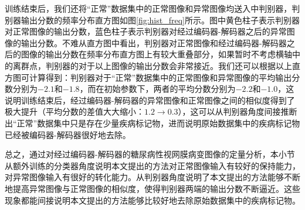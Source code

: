 训练结束后，我们还将“正常”数据集中的正常图像和异常图像均送入中判别器，判别器输出分数的频率分布直方图如图\ref{fig:hist_freq}所示。图中黄色柱子表示判别器对正常图像的输出分数，蓝色柱子表示判别器对经过编码器-解码器之后的异常图像的输出分数。不难从直方图中看出，判别器对正常图像和经过编码器-解码器之后的图像的输出分数在频率分布直方图上有较大重叠部分，如果暂时不考虑横轴中的离群点，判别器的对于以上图像的输出分数会非常接近。我们还可以根据以上直方图可计算得到：判别器对于“正常”数据集中的正常图像和异常图像的平均输出分数分别为$-2.1$和$-1.8$，而在初始参数下，两者的平均分数分别为$-2.2$和$-1.0$，这说明训练结束后，经过编码器-解码器的异常图像和正常图像之间的相似度得到了极大提升（平均分数的差值大大缩小：$1.2\rightarrow 0.3$），这可以从判别器角度间接推断出“正常”数据集中只是存在少量疾病标记物，进而说明原始数据集中的疾病标记物已经被编码器-解码器很好地去除。

总之，通过对经过编码器-解码器的糖尿病性视网膜病变图像的定量分析，本小节从额外训练的分类器角度说明本文提出的方法对正常图像输入有较好的保持能力，对异常图像输入有很好的转化能力。从判别器角度说明了本文提出的方法能够不断地提高异常图像与正常图像的相似度，使得判别器两端的输出分数不断逼近。这些现象都能间接说明本文提出的方法能够比较好地去除原始数据集中的疾病标记物。
